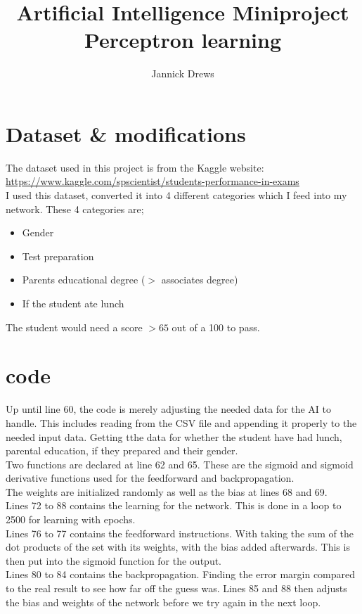 \documentclass{article}
\title{Artificial Intelligence Miniproject\\Perceptron learning}
\author{Jannick Drews}
\begin{document}
\maketitle

\section{Dataset \& modifications}
The dataset used in this project is from the Kaggle website:
\url{
		https://www.kaggle.com/spscientist/students-performance-in-exams
	}\\
I used this dataset, converted it into 4 different categories which I feed into my network. These 4 categories are;
\begin{itemize}
	\item Gender
	\item Test preparation
	\item Parents educational degree ($>$ associates degree)
	\item If the student ate lunch
\end{itemize}
The student would need a score $> 65$ out of a 100 to pass.

\section{code}

Up until line 60, the code is merely adjusting the needed data for the AI to handle. This includes reading from the CSV file and appending it properly to the needed input data. Getting tthe data for whether the student have had lunch, parental education, if they prepared and their gender.\\

Two functions are declared at line 62 and 65. These are the sigmoid and sigmoid derivative functions used for the feedforward and backpropagation.\\
The weights are initialized randomly as well as the bias at lines 68 and 69.\\
Lines 72 to 88 contains the learning for the network. This is done in a loop to 2500 for learning with epochs.\\
Lines 76 to 77 contains the feedforward instructions. With taking the sum of the dot products of the set with its weights, with the bias added afterwards. This is then put into the sigmoid function for the output.\\
Lines 80 to 84 contains the backpropagation. Finding the error margin compared to the real result to see how far off the guess was. Lines 85 and 88 then adjusts the bias and weights of the network before we try again in the next loop.
\end{document}
